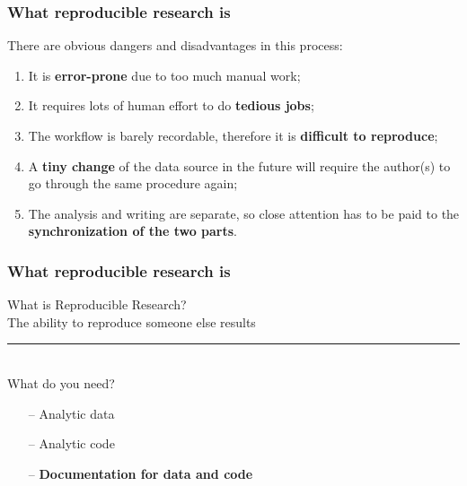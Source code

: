 \documentclass{beamer}
\begin{document}
\begin{frame}
\frametitle{What reproducible research is}
\Large There are obvious dangers and disadvantages in this process:
\small\begin{enumerate}
	\item It is \textbf{error-prone} due to too much manual work;
	\item It requires lots of human effort to do \textbf{tedious jobs}; 
	\item The workflow is barely recordable, therefore it is \textbf{difficult to reproduce};
	\item A \textbf{tiny change} of the data source in the future will require the author(s) to go through the same procedure again;
	\item The analysis and writing are separate, so close attention has to be paid to the \textbf{synchronization of the two parts}.
\end{enumerate}
\end{frame}


\begin{frame}
\frametitle{What reproducible research is}
\Large \centering What is Reproducible Research?\\ 
{\sc The ability to reproduce someone else results}\\
\rule{\textwidth}{0.1pt}\\
\Large \centering What do you need?\\ 
\begin{itemize}
\item[--] Analytic data 
\item[--] Analytic code
\item[--] {\bf Documentation for data and code} 
\end{itemize}
\end{frame}


\end{document}
